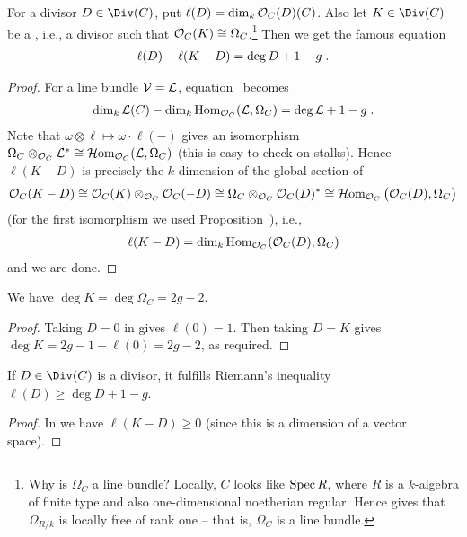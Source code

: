 \documentclass[a4paper,parskip=half,numbers=enddot, DIV=12]{scrreprt}
\renewcommand{\geq}{\geqslant}
\begin{document}
\begin{cor}
	For a divisor $D\in\Div(C)$, put $\ell(D)=\dim_k\mathcal{O}_C(D)(C)$. Also let $K\in\Div(C)$ be a , i.e., a divisor such that $\mathcal{O}_C(K)\cong\Omega_C$.\footnote{Why is $\Omega_C$ a line bundle? Locally, $C$ looks like $\operatorname{Spec} R$, where $R$ is a $k$-algebra of finite type and also one-dimensional noetherian regular. Hence \cite[Proposition~1.6.3]{alg2} gives that $\Omega_{R/k}$ is locally free of rank one -- that is, $\Omega_C$ is a line bundle.} Then we get the famous equation
	\begin{align}\lbl{eq:RiemannRoch3}
		\ell(D)-\ell(K-D)=\deg D+1-g\;.
	\end{align}
\end{cor}
\begin{proof}
	For a line bundle $\mathcal{V}=\mathcal{L}$, equation~ becomes 
	\begin{align*}
		\dim_k\mathcal{L}(C)-\dim_k\operatorname{Hom}_{\mathcal{O}_C}(\mathcal{L},\Omega_C)=\deg\mathcal{L}+1-g\;.
	\end{align*}
	Note that $\omega\otimes\ell\mapsto \omega\cdot \ell(-)$ gives an isomorphism $\Omega_C\otimes_{\mathcal{O}_C}\mathcal{L}^*\cong\operatorname{\mathcal{H} om}_{\mathcal{O}_C}(\mathcal{L},\Omega_C)$ (this is easy to check on stalks). Hence $\ell(K-D)$ is precisely the $k$-dimension of the global section of 
	\begin{align*}
		\mathcal{O}_C(K-D)\cong\mathcal{O}_C(K)\otimes_{\mathcal{O}_C}\mathcal{O}_C(-D)\cong \Omega_C\otimes_{\mathcal{O}_C}\mathcal{O}_C(D)^*\cong \operatorname{\mathcal{H} om}_{\mathcal{O}_C}\big(\mathcal{O}_C(D),\Omega_C\big)
	\end{align*}
	(for the first isomorphism we used Proposition~), i.e.,
	\begin{align*}
		\ell(K-D)=\dim_k\operatorname{Hom}_{\mathcal{O}_C}(\mathcal{O}_C(D),\Omega_C)
	\end{align*}
	and we are done.
\end{proof}
\begin{cor}
	We have $\deg K=\deg\Omega_C=2g-2$.
\end{cor}
\begin{proof}
	Taking $D=0$ in  gives $\ell(0)=1$. Then taking $D=K$ gives $\deg K=2g-1-\ell(0)=2g-2$, as required.
\end{proof}
\begin{cor}
	If $D\in\Div(C)$ is a divisor, it fulfills Riemann's inequality $\ell(D)\geq \deg D+1-g$.
\end{cor}
\begin{proof}
	In  we have $\ell(K-D)\geq 0$ (since this is a dimension of a vector space).
\end{proof}
\end{document}
